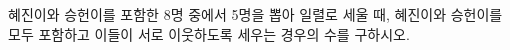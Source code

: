 \hspace*{2mm}\begin{minipage}[t]{\dimexpr\linewidth-2mm\relax}\vspace{0pt}
혜진이와 승헌이를 포함한 8명 중에서 5명을 뽑아 일렬로 세울 때, 혜진이와 승헌이를 모두 포함하고 이들이 서로 이웃하도록 세우는 경우의 수를 구하시오.\end{minipage}
